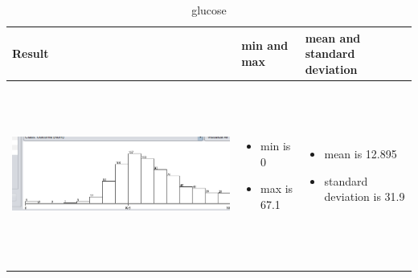 \documentclass{article}
\begin{document}
\begin{table}[h!]
  \centering
  \begin{tabular}{ | m{5 cm} | m{3cm} | m{3cm} | }
    \hline
   Result &  min and max & mean and standard deviation \\ \hline
    \begin{minipage}{.3\textwidth}
      \includegraphics[width=\linewidth, height=60mm]{glucose.png}
    \end{minipage}
    &
      \begin{itemize}
        \item  min is 0
        \item max is 67.1
          
      \end{itemize}
    & 
      \begin{itemize}
        \item  mean is 12.895
        \item  standard deviation is 31.9
          
      \end{itemize}
    \\ \hline
  \end{tabular}
  \caption{ glucose }\label{tbl:myLboro}
\end{table}
\end{document}
